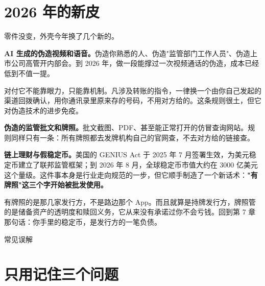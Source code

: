 \section{2026 年的新皮}

零件没变，外壳今年换了几个新的。

\textbf{AI 生成的伪造视频和语音。}伪造你熟悉的人、伪造"监管部门工作人员"、伪造上市公司高管开内部会。到 2026 年，做一段能撑过一次视频通话的伪造，成本已经低到不值一提。

对付它不能靠眼力，只能靠机制。凡涉及转账的指令，一律换一个由你自己发起的渠道回拨确认，用你通讯录里原来存的号码，不用对方给的。这条规则很土，但它对伪造技术的进步免疫。

\textbf{伪造的监管批文和牌照。}批文截图、PDF、甚至能正常打开的仿冒查询网站。规则同样只有一条：所有牌照都去发牌机构自己的官网查，不去对方给的链接查。

\textbf{链上理财与假稳定币。}美国的 GENIUS Act 于 2025 年 7 月签署生效，为美元稳定币建立了联邦监管框架；到 2026 年 8 月，全球稳定币市值大约在 3000 亿美元这个量级。这件事本身是行业走向规范的一步，但它顺手制造了一个新话术：\textbf{"有牌照"这三个字开始被批发使用。}

有牌照的是那几家发行方，不是路边那个 App。而且就算是持牌发行方，牌照管的是储备资产的透明度和赎回义务，它从来没有承诺过你不会亏钱。回到第 7 章那句话：你手里的稳定币，是发行方的一笔负债。

\begin{talkbox}
\end{talkbox}

\begin{mythbox}{常见误解}
\end{mythbox}

\section{只用记住三个问题}

